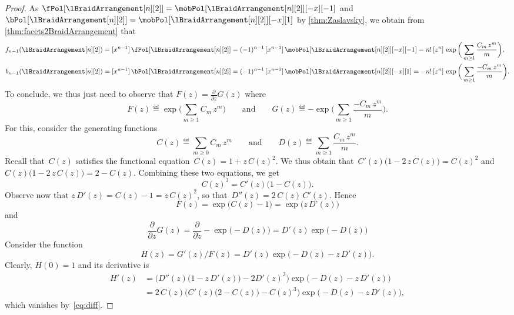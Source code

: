 \begin{proof}
As $\fPol[{\lBraidArrangement[n][2]}] = \mobPol[{\lBraidArrangement[n][2]}][-x][-1]$ and $\bPol[{\lBraidArrangement[n][2]}] = \mobPol[{\lBraidArrangement[n][2]}][-x][1]$ by \cref{thm:Zaslavsky}, we obtain from \cref{thm:facets2BraidArrangement} that
\begin{align*}
f_{n-1}(\lBraidArrangement[n][2]) & = [x^{n-1}] \, \fPol[{\lBraidArrangement[n][2]}] = (-1)^{n-1} \, [x^{n-1}] \, \mobPol[{\lBraidArrangement[n][2]}][-x][-1] = n! \, [z^n]  \, \exp \bigg( \sum_{m \ge 1} \frac{C_m \, z^m}{m} \bigg), \\
b_{n-1}(\lBraidArrangement[n][2]) & = [x^{n-1}] \, \bPol[{\lBraidArrangement[n][2]}] = (-1)^{n-1} \, [x^{n-1}] \, \mobPol[{\lBraidArrangement[n][2]}][-x][1] = - n! \, [z^n]  \, \exp \bigg( \sum_{m \ge 1} \frac{- C_m \, z^m}{m} \bigg).
\end{align*}
To conclude, we thus just need to observe that
\(
F(z) = \frac{\partial}{\partial z} G(z)
\)
where
\[
F(z) \eqdef \exp \bigg( \sum_{m \ge 1} C_m \, z^m \bigg)
\qquad\text{and}\qquad
G(z) \eqdef - \exp \bigg( \sum_{m \ge 1} \frac{- C_m \, z^m}{m} \bigg).
\]
For this, consider the generating functions
\[
C(z) \eqdef \sum_{m \ge 0} C_m \, z^m
\qquad\text{and}\qquad
D(z) \eqdef \sum_{m \ge 1} \frac{C_m \, z^m}{m}.
\]
Recall that~$C(z)$ satisfies the functional equation~$C(z) = 1 + z \, C(z)^2$.
We thus obtain that~$C'(z) \big( 1 - 2 \, z \, C(z) \big) = C(z)^2$ and $C(z) \big( 1 - 2 \, z \, C(z) \big) = 2 - C(z)$.
Combining these two equations, we get
\begin{equation}
\label{eq:diff}
C(z)^3 = C'(z) \big( 1 - C(z) \big).
\end{equation}
Observe now that $z \, D'(z) = C(z) - 1 = z \, C(z)^2$, so that~$D''(z) = 2 \, C(z) \, C'(z)$.
Hence
\[
F(z) = \exp \big( C(z) - 1 \big) = \exp \big( z \, D’(z) \big)
\]
and
\[
\frac{\partial}{\partial z} G(z) = \frac{\partial}{\partial z}  - \exp \big( -D(z) \big) = D'(z) \exp \big( -D(z) \big)
\]
Consider the function
\[
H(z) = G'(z) / F(z) = D'(z) \exp \big( -D(z) - z \, D'(z) \big).
\]
Clearly, $H(0) = 1$ and its derivative is
\begin{align*}
H'(z)
& = \Big( D''(z) \big(1 - z \, D'(z) \big) - 2 D'(z)^2 \Big) \exp \big( -D(z) - z \, D'(z) \big) \\
& = 2 \, C(z) \Big( C'(z) \big( 2 - C(z) \big) - C(z)^3 \Big) \exp \big( - D(z) - z \, D'(z) \big),
\end{align*}
which vanishes by~\eqref{eq:diff}.

\end{proof}

